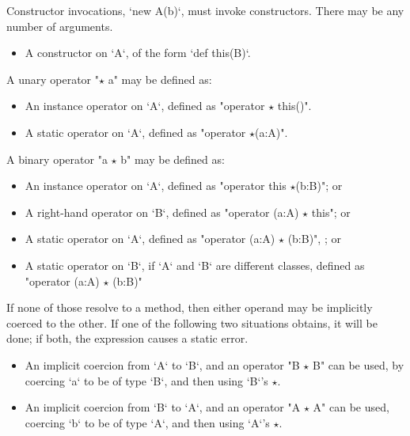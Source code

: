 Constructor invocations, \xcd`new A(b)`, must invoke constructors. There may
be any number of arguments. 
\begin{itemize}
\item A constructor on \xcd`A`, of the form \xcd`def this(B)`.
\end{itemize}


A unary operator \xcdmath"$\star$ a" may be defined as: 
\begin{itemize}
\item An instance operator on \xcd`A`, defined as 
      \xcdmath"operator $\star$ this()".
\item A static operator on \xcd`A`, defined as 
      \xcdmath"operator $\star$(a:A)".
\end{itemize}

A binary operator \xcdmath"a $\star$ b" may be defined as: 
\begin{itemize}
\item An instance operator on \xcd`A`, defined as 
      \xcdmath"operator this $\star$(b:B)";
or
\item A right-hand operator on \xcd`B`, defined as
      \xcdmath"operator (a:A) $\star$ this"; or

\item A static operator on \xcd`A`, defined as
      \xcdmath"operator (a:A) $\star$ (b:B)", 
; or
\item A static operator on \xcd`B`, if \xcd`A` and \xcd`B` are different
      classes, defined as
      \xcdmath"operator (a:A) $\star$ (b:B)"
\end{itemize}
\noindent
If none of those resolve to a method, then either operand may be implicitly
coerced to the
other.  If one of the following two situations obtains, it will be done; if
both, the expression causes a static error.
\begin{itemize}
\item An implicit coercion from \xcd`A` to \xcd`B`, and 
      an operator \xcdmath"B $\star$ B" can be used, by 
      coercing \xcd`a` to be of type \xcd`B`, and then using \xcd`B`'s
      $\star$.  
\item An implicit coercion from \xcd`B` to \xcd`A`, and 
      an operator \xcdmath"A $\star$ A" can be used,
      coercing \xcd`b` to be of type \xcd`A`, and then using \xcd`A`'s
      $\star$.  
\end{itemize}

